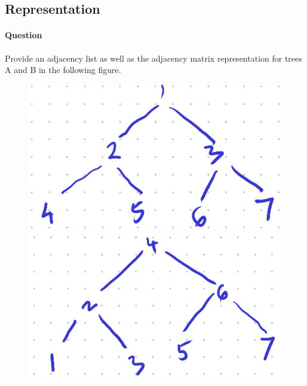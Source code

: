 \documentclass[11pt]{article}
\begin{document}
\subsection{Representation}
\label{sec:org632ead9}

\paragraph*{Question}
\label{sec:orgdb29d41}
Provide an adjacency list as well as the adjacency matrix
representation for trees A and B in the following figure.

\begin{figure}[!h]
\centering
\begin{minipage}{0.4\textwidth}
\centering
\includegraphics[width=\linewidth]{./images/treeA.png}
\end{minipage}
\begin{minipage}{0.5\textwidth}
\centering
\includegraphics[width=\linewidth]{./images/treeB.png}
\end{minipage}
\end{figure}
\end{document}
